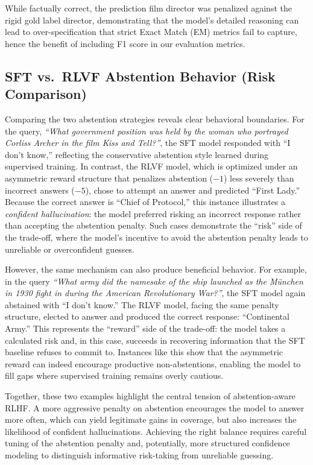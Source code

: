 \documentclass{article}
\begin{document}
While factually correct, the prediction film director was penalized against the rigid gold label director, demonstrating that the model’s detailed reasoning can lead to over-specification that strict Exact Match (EM) metrics fail to capture, hence the benefit of including F1 score in our evaluation metrics.

\subsection{SFT vs.\ RLVF Abstention Behavior (Risk Comparison)}

Comparing the two abstention strategies reveals clear behavioral boundaries. For the query, \emph{``What government position was held by the woman who portrayed Corliss Archer in the film \textit{Kiss and Tell}?''}, the SFT model responded with ``I don't know,'' reflecting the conservative abstention style learned during supervised training. In contrast, the RLVF model, which is optimized under an asymmetric reward structure that penalizes abstention ($-1$) less severely than incorrect answers ($-5$), chose to attempt an answer and predicted ``First Lady.'' Because the correct answer is ``Chief of Protocol,'' this instance illustrates a \textit{confident hallucination}: the model preferred risking an incorrect response rather than accepting the abstention penalty. Such cases demonstrate the ``risk'' side of the trade-off, where the model's incentive to avoid the abstention penalty leads to unreliable or overconfident guesses.

However, the same mechanism can also produce beneficial behavior. For example, in the query \emph{``What army did the namesake of the ship launched as the M\"unchen in 1930 fight in during the American Revolutionary War?''}, the SFT model again abstained with ``I don't know.'' The RLVF model, facing the same penalty structure, elected to answer and produced the correct response: ``Continental Army.'' This represents the ``reward'' side of the trade-off: the model takes a calculated risk and, in this case, succeeds in recovering information that the SFT baseline refuses to commit to. Instances like this show that the asymmetric reward can indeed encourage productive non-abstentions, enabling the model to fill gaps where supervised training remains overly cautious.

Together, these two examples highlight the central tension of abstention-aware RLHF. A more aggressive penalty on abstention encourages the model to answer more often, which can yield legitimate gains in coverage, but also increases the likelihood of confident hallucinations. Achieving the right balance requires careful tuning of the abstention penalty and, potentially, more structured confidence modeling to distinguish informative risk-taking from unreliable guessing.
\end{document}
